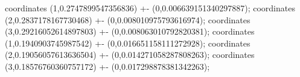 coordinates {(1,0.2747899547356836) +- (0,0.006639151340297887)};
coordinates {(2,0.2837178167730468) +- (0,0.008010975793616974)};
coordinates {(3,0.29216052614897803) +- (0,0.008063010792820381)};
coordinates {(1,0.1940903745987542) +- (0,0.016651158111272928)};
coordinates {(2,0.19056057613636504) +- (0,0.014271058287808263)};
coordinates {(3,0.18576760360757172) +- (0,0.017298878381342263)};

